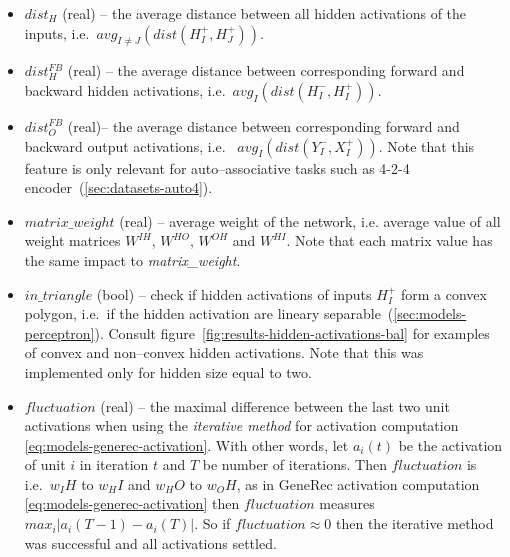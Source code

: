 \begin{itemize} 
\label{sec:our-h-dist} 
\item $dist_{H}$ (real) -- the average distance between all hidden activations of the inputs, i.e.~$avg_{I \neq J}\left(dist(H_I^{+},H_J^{+})\right)$. %

\label{sec:our-dist-h-fb}
\item $dist_{H}^{FB}$ (real) -- the average distance between corresponding forward and backward hidden activations, i.e.~$avg_{I}\left(dist(H_I^{-},H_I^{+})\right)$.

\label{sec:our-dist-o-fb}
\item	$dist_{O}^{FB}$ (real)-- the average distance between corresponding forward and backward output activations, i.e.~  $avg_{I}\left(dist(Y_I^{-},X_I^{+})\right)$. Note that this feature is only relevant for auto--associative tasks such as 4-2-4 encoder~(\ref{sec:datasets-auto4}). 

\label{sec:our-m-wei}
\item $matrix\_weight$ (real) -- average weight of the network, i.e. average value of all weight matrices $W^{IH}$, $W^{HO}$, $W^{OH}$ and $W^{HI}$. Note that each matrix value has the same impact to \emph{matrix\_weight}. 


\label{sec:our-in-triangle}
\item $in\_triangle$ (bool) -- check if hidden activations of inputs  $H_I^{+}$ form a convex polygon, i.e.~if the hidden activation are lineary separable~(\ref{sec:models-perceptron}). Consult figure~\ref{fig:results-hidden-activations-bal} for examples of convex and non--convex hidden activations. Note that this was implemented only for hidden size equal to two. %

\label{eq:our-fluctuation}
\item $fluctuation$ (real) -- the maximal difference between the last two unit activations when using the \emph{iterative method} for activation computation \ref{eq:models-generec-activation}. With other words, let $a_i(t)$ be the activation of unit $i$ in iteration $t$ and $T$ be number of iterations. Then $fluctuation$ is i.e.~$w_IH$ to $w_HI$ and $w_HO$ to $w_OH$, as in GeneRec activation computation \ref{eq:models-generec-activation} then $fluctuation$ measures $max_i|a_i(T-1) - a_i(T)|$. So if $fluctuation \approx 0$ then the iterative method was successful and all activations settled.
\end{itemize} 

